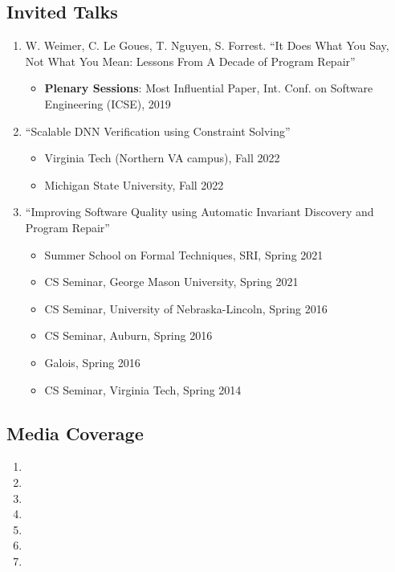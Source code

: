\documentclass[11pt]{article}
\begin{document}
\subsection{Invited Talks}
\begin{enumerate}[label=T\arabic*]
    \item W. Weimer, C. Le Goues, T. Nguyen, S. Forrest. ``It Does What You Say, Not What You Mean: Lessons From A Decade of Program Repair''
    \begin{itemize}[label={},before=\small]
        \item \textbf{Plenary Sessions}:  Most Influential Paper, Int. Conf. on Software Engineering (ICSE), 2019
    \end{itemize}
    
    \item ``Scalable DNN Verification using Constraint Solving''
    \begin{itemize}[label={},before=\small]
        \item Virginia Tech (Northern VA campus), Fall 2022
        \item Michigan State University, Fall 2022
    \end{itemize}
    
    \item ``Improving Software Quality using Automatic Invariant Discovery and Program Repair''
    \begin{itemize}[label={},before=\small]
        \item Summer School on Formal Techniques, SRI, Spring 2021
        \item CS Seminar, George Mason University, Spring 2021
        \item CS Seminar, University of Nebraska-Lincoln, Spring 2016
        \item CS Seminar, Auburn, Spring 2016
        \item Galois, Spring 2016
        \item CS Seminar, Virginia Tech, Spring 2014
    \end{itemize}
\end{enumerate}



\subsection{Media Coverage}
\begin{enumerate}[label=M\arabic*]
    \item {}
    \item {}
    \item {}
    \item {}
    \item {}
    \item {}
    \item {}
\end{enumerate}
\end{document}

